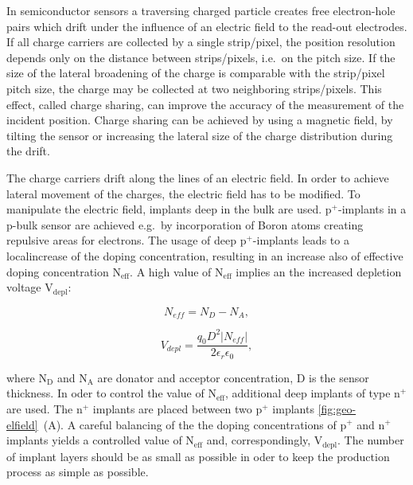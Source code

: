 
In semiconductor sensors a traversing charged particle creates free electron-hole pairs which drift under the influence of an electric field to the read-out electrodes. 
If all charge carriers are collected by a single strip/pixel, the position resolution depends only on the distance between strips/pixels, i.e.\ on the pitch size. 
If the size of the lateral broadening of the charge is comparable with the strip/pixel pitch size, the charge may be collected at two neighboring strips/pixels. %
This effect, called charge sharing, can improve the accuracy of the measurement of the incident position. 
Charge sharing can be achieved by using a magnetic field, by tilting the sensor or increasing the lateral size of the charge distribution during the drift.

The charge carriers drift along the lines of an electric field. 
In order to achieve lateral movement of the charges, the electric field has to be modified. 
To manipulate the electric field, implants deep in the bulk are used. 
p$^{\textrm{+}}$-implants in a p-bulk sensor are achieved e.g.\ by incorporation of Boron atoms creating repulsive areas for electrons. 
The usage of deep p$^{\textrm{+}}$-implants leads to a localincrease of the doping concentration, resulting in an increase also of effective doping concentration N$_{\textrm{eff}}$.
A high value of N$_{\textrm{eff}}$ implies an the increased depletion voltage V$_{\textrm{depl}}$:

\begin{equation}
 N_{eff}=N_{D}-N_{A} ,
\end{equation}

\begin{equation}
 V_{depl}=\frac{q_0 D^2 |N_{eff}|}{2 \epsilon_r \epsilon_0 } ,
\end{equation}

\noindent where N$_{\textrm{D}}$ and N$_{\textrm{A}}$ are donator and acceptor concentration, D is the sensor thickness.
In oder to control the value of N$_{\textrm{eff}}$, additional deep implants of type n$^{\textrm{+}}$ are used. 
The n$^{\textrm{+}}$ implants are placed between two p$^{\textrm{+}}$ implants \ref{fig:geo-elfield}~(A). %
A careful balancing of the the doping concentrations of p$^{\textrm{+}}$ and n$^{\textrm{+}}$ implants yields a controlled value of N$_{\textrm{eff}}$ and, correspondingly, V$_{\textrm{depl}}$. 
The number of implant layers should be as small as possible in oder to keep the production process as simple as possible. 


